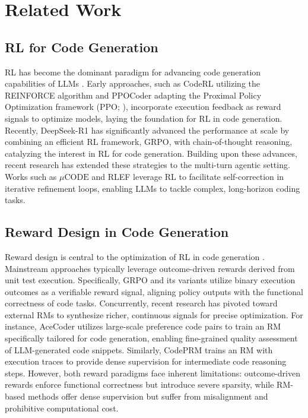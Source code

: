 \documentclass[11pt]{article}
\begin{document}
\section{Related Work}

\subsection{RL for Code Generation} 
RL has become the dominant paradigm for advancing code generation capabilities of LLMs \cite{liu2023rltf,wang2024enhancing-rlwithcode, zhang2025surveyreinforcementlearninglarge-rlwithcode}.
Early approaches, such as CodeRL \cite{le2022coderl} utilizing the REINFORCE algorithm \cite{williams1992Reinforce-algo} and PPOCoder \cite{shojaee2023execution-ppocoder} adapting the Proximal Policy Optimization framework (PPO; \citealp{schulman2017ppo}), incorporate execution feedback as reward signals to optimize models, laying the foundation for RL in code generation. Recently, DeepSeek-R1 \cite{guo2025deepseek} has significantly advanced the performance at scale by combining an efficient RL framework, GRPO, with chain-of-thought reasoning, catalyzing the interest in RL for code generation. Building upon these advances, recent research has extended these strategies to the multi-turn agentic setting. Works such as $\mu\text{CODE}$ \cite{jain2025multiturnthrougOne} and RLEF \cite{gehring2024rlef} leverage RL to facilitate self-correction in iterative refinement loops, enabling LLMs to tackle complex, long-horizon coding tasks.

\subsection{Reward Design in Code Generation}
Reward design is central to the optimization of RL in code generation \cite{sun2025large-rewarddesign,xu2025policy-rewarddesign}.
Mainstream approaches typically leverage outcome-driven rewards derived from unit test execution. 
Specifically, GRPO and its variants \cite{yu2025dapo, yue2025vapo, ahmadian2024back-leave-one-out} utilize binary execution outcomes as a verifiable reward signal, aligning policy outputs with the functional correctness of code tasks. 
Concurrently, recent research has pivoted toward external RMs to synthesize richer, continuous signals for precise optimization. For instance, AceCoder \cite{zeng-etal-2025-acecoder} utilizes large-scale preference code pairs to train an RM specifically tailored for code generation, enabling fine-grained quality assessment of LLM-generated code snippets. Similarly, CodePRM \cite{li2025codeprm} trains an RM with execution traces to provide dense supervision for intermediate code reasoning steps. However, both reward paradigms face inherent limitations: outcome-driven rewards enforce functional correctness but introduce severe sparsity, while RM-based methods offer dense supervision but suffer from misalignment and prohibitive computational cost.
\end{document}
